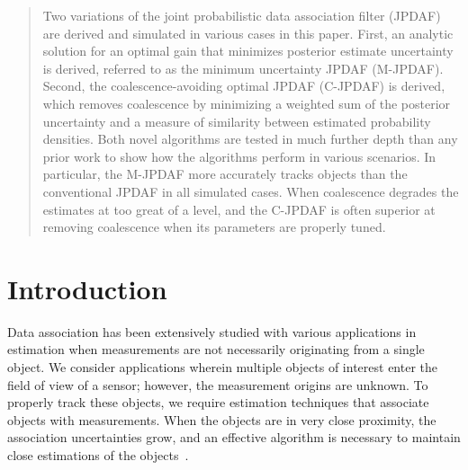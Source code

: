 \begin{abstract}
Two variations of the joint probabilistic data association filter (JPDAF) are derived and simulated in various cases in this paper.
First, an analytic solution for an optimal gain that minimizes posterior estimate uncertainty is derived, referred to as the minimum uncertainty JPDAF (M-JPDAF).
Second, the coalescence-avoiding optimal JPDAF (C-JPDAF) is derived, which removes coalescence by minimizing a weighted sum of the posterior uncertainty and a measure of similarity between estimated probability densities.
Both novel algorithms are tested in much further depth than any prior work to show how the algorithms perform in various scenarios.
In particular, the M-JPDAF more accurately tracks objects than the conventional JPDAF in all simulated cases.
When coalescence degrades the estimates at too great of a level, and the C-JPDAF is often superior at removing coalescence when its parameters are properly tuned.
\end{abstract}

\section{Introduction}

Data association has been extensively studied with various applications in estimation when measurements are not necessarily originating from a single object.
We consider applications wherein multiple objects of interest enter the field of view of a sensor; however, the measurement origins are unknown.
To properly track these objects, we require estimation techniques that associate objects with measurements.
When the objects are in very close proximity, the association uncertainties grow, and an effective algorithm is necessary to maintain close estimations of the objects~\cite{KauLovLee14}.

